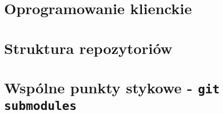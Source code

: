 \section{Oprogramowanie klienckie}

\section{Struktura repozytoriów}

\section{Wspólne punkty stykowe - \texttt{git submodules}}

